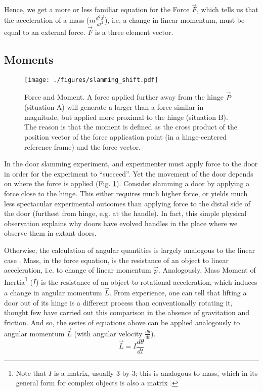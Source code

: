 Hence, we get a more or less familiar equation for the Force \(\vec{F}\), which tells us that the acceleration of a mass (\(m \frac{d^2\vec{x}}{dt^2}\)), i.e. a change in linear momentum, must be equal to an external force.
\(\vec{F}\) is a three element vector.


\subsection{Moments}
\label{sec:org837dc40}

\begin{figure}[p]
\centering
\texttt{[image: ./figures/slamming\_shift.pdf]}
\caption{\label{fig:slamming_moment}Force and Moment. A force applied further away from the hinge \(\vec{P}\) (situation A) will generate a larger  than a force similar in magnitude, but applied more proximal to the hinge (situation B). The reason is that the moment is defined as the cross product of the position vector of the force application point (in a hinge-centered reference frame) and the force vector. }
\end{figure}

In the door slamming experiment, and experimenter must apply force to the door in order for the experiment to ``succeed''.
Yet the movement of the door depends on where the force is applied (Fig. \ref{fig:slamming_moment}).
Consider slamming a door by applying a force close to the hinge.
This either requires much higher force, or yields much less spectacular experimental outcomes than applying force to the distal side of the door (furthest from hinge, e.g. at the handle).
In fact, this simple physical observation explains why doors have evolved handles in the place where we observe them in extant doors.


Otherwise, the calculation of angular quantities is largely analogous to the linear case \citep{Lewin801L20,Tipler2007}.
Mass, in the force equation, is the resistance of an object to linear acceleration, i.e. to change of linear momentum \(\vec{p}\).
Analogously, Mass Moment of Inertia\footnote{Note that \(I\) is a matrix, usually 3-by-3; this is analogous to mass, which in its general form for complex objects is also a matrix \citep{Lynch2017}.} (\(I\)) is the resistance of an object to rotational acceleration, which induces a change in angular momentum \(\vec{L}\).
From experience, one can tell that lifting a door out of its hinge is a different process than conventionally rotating it, thought few have carried out this comparison in the absence of gravitation and friction.
And so, the series of equations above can be applied analogously to angular momentum \(\vec{L}\) (with angular velocity \(\frac{d\theta}{dt}\)).
\[\vec{L} = I \frac{d\theta}{dt}\]

